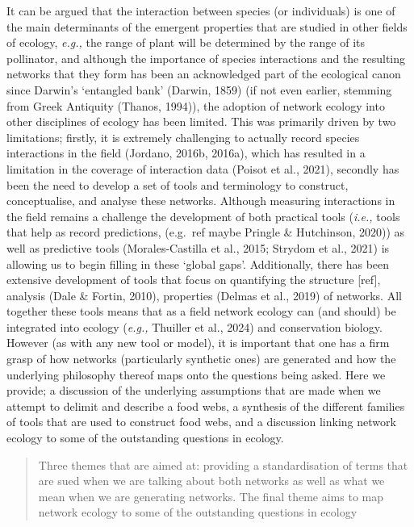 \documentclass[
]{agujournal2019}
\begin{document}
It can be argued that the interaction between species (or individuals)
is one of the main determinants of the emergent properties that are
studied in other fields of ecology, \emph{e.g.,} the range of plant will
be determined by the range of its pollinator, and although the
importance of species interactions and the resulting networks that they
form has been an acknowledged part of the ecological canon since
Darwin's `entangled bank' (Darwin, 1859) (if not even earlier, stemming
from Greek Antiquity (Thanos, 1994)), the adoption of network ecology
into other disciplines of ecology has been limited. This was primarily
driven by two limitations; firstly, it is extremely challenging to
actually record species interactions in the field (Jordano, 2016b,
2016a), which has resulted in a limitation in the coverage of
interaction data (Poisot et al., 2021), secondly has been the need to
develop a set of tools and terminology to construct, conceptualise, and
analyse these networks. Although measuring interactions in the field
remains a challenge the development of both practical tools
(\emph{i.e.,} tools that help as record predictions, (e.g.~ref maybe
Pringle \& Hutchinson, 2020)) as well as predictive tools
(Morales-Castilla et al., 2015; Strydom et al., 2021) is allowing us to
begin filling in these `global gaps'. Additionally, there has been
extensive development of tools that focus on quantifying the structure
{[}ref{]}, analysis (Dale \& Fortin, 2010), properties (Delmas et al.,
2019) of networks. All together these tools means that as a field
network ecology can (and should) be integrated into ecology
(\emph{e.g.,} Thuiller et al., 2024) and conservation biology. However
(as with any new tool or model), it is important that one has a firm
grasp of how networks (particularly synthetic ones) are generated and
how the underlying philosophy thereof maps onto the questions being
asked. Here we provide; a discussion of the underlying assumptions that
are made when we attempt to delimit and describe a food webs, a
synthesis of the different families of tools that are used to construct
food webs, and a discussion linking network ecology to some of the
outstanding questions in ecology.

\begin{quote}
Three themes that are aimed at: providing a standardisation of terms
that are sued when we are talking about both networks as well as what we
mean when we are generating networks. The final theme aims to map
network ecology to some of the outstanding questions in ecology
\end{quote}
\end{document}
